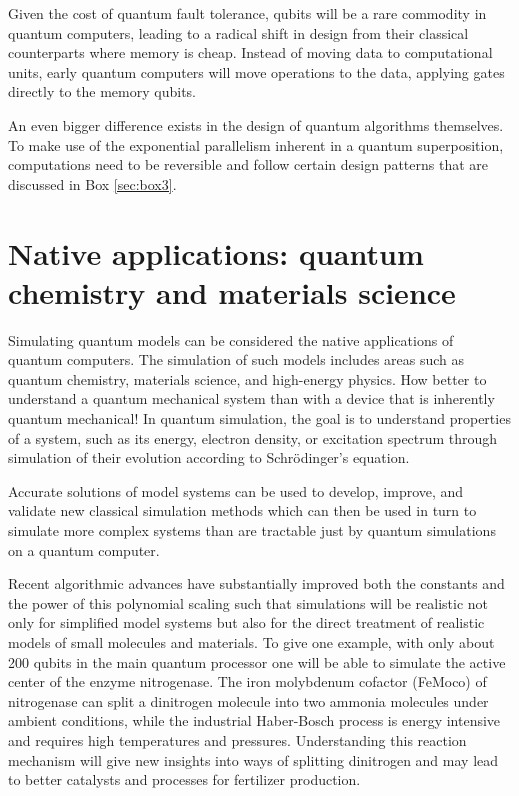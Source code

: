 \documentclass[journal]{IEEEtran}
\begin{document}
Given the cost of quantum fault tolerance, qubits will be a rare commodity in quantum computers, leading to a radical shift in design from their classical counterparts where memory is cheap. Instead of moving data to computational units, early quantum computers will move operations to the data, applying gates directly to the memory qubits.

 An even bigger difference exists in the design of quantum algorithms themselves. To make use of the  exponential parallelism inherent in a quantum superposition, computations need to be reversible and follow certain design patterns that are discussed in Box \ref{sec:box3}. 





\section{Native applications: quantum chemistry and materials science}

Simulating quantum models can be considered the native applications of quantum computers. The simulation of such models includes areas such as quantum chemistry, materials science, and high-energy physics. How better to understand a quantum mechanical system than with a device that is inherently quantum mechanical! In quantum simulation, the goal is to understand properties of a system, such as its energy, electron density, or excitation spectrum through simulation of their evolution according to Schr\"odinger's equation.  


 Accurate solutions of model systems can be used to develop, improve, and validate new classical simulation methods which can then be used in turn to simulate more complex systems than are tractable just by quantum simulations on a quantum computer. 

Recent algorithmic advances have substantially improved both the constants and the power of this polynomial scaling such that simulations will be realistic not only for simplified model systems but also for the direct  treatment of realistic models of small molecules and materials. To give one example, with only about 200 qubits in the main quantum processor one will be able to simulate the active center of the enzyme nitrogenase. The iron molybdenum cofactor (FeMoco) of nitrogenase can split a dinitrogen molecule into two ammonia molecules under ambient conditions, while the industrial Haber-Bosch process  is energy intensive and requires high temperatures and pressures. Understanding this reaction mechanism will give new insights into ways of splitting dinitrogen and may lead to better catalysts and processes for fertilizer production.
\end{document}
